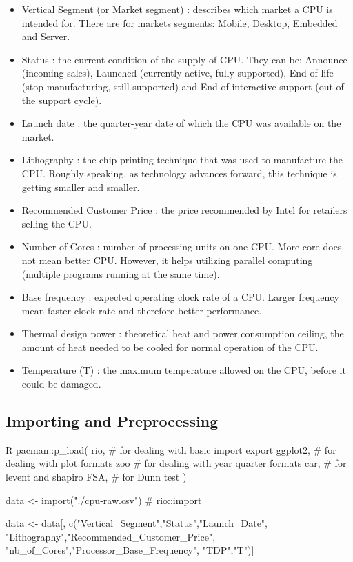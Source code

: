 \begin{itemize}
    \item Vertical Segment (or Market segment) : describes which market a CPU is intended for. There are for markets segments: Mobile, Desktop, Embedded and Server. 
    \item Status : the current condition of the supply of CPU. They can be: Announce (incoming sales), Launched (currently active, fully supported), End of life (stop manufacturing, still supported) and
    End of interactive support (out of the support cycle).
    \item Launch date : the quarter-year date of which the CPU was available on the market.
    \item Lithography : the chip printing technique that was used to manufacture the CPU. Roughly speaking, as technology advances forward, this technique is getting smaller and smaller.
    \item Recommended Customer Price : the price recommended by Intel for retailers selling the CPU.
    \item Number of Cores : number of processing units on one CPU. More core does not mean better CPU. However, it helps utilizing parallel computing (multiple programs running at the same time).
    \item Base frequency : expected operating clock rate of a CPU. Larger frequency mean faster clock rate and therefore better performance.
    \item Thermal design power : theoretical heat and power consumption ceiling, the amount of heat needed to be cooled for normal operation of the CPU.
    \item Temperature (T) : the maximum temperature allowed on the CPU, before it could be damaged.
\end{itemize}










\subsection{Importing and Preprocessing}

\begin{code}{R}
pacman::p_load(
    rio,     # for dealing with basic import export
    ggplot2, # for dealing with plot formats
    zoo      # for dealing with year quarter formats
    car,     # for levent and shapiro
    FSA,     # for Dunn test
)

data <- import("./cpu-raw.csv") # rio::import

data <- data[, c("Vertical_Segment","Status","Launch_Date",
                 "Lithography","Recommended_Customer_Price",
                 "nb_of_Cores","Processor_Base_Frequency",
                 "TDP","T")] 
\end{code}

